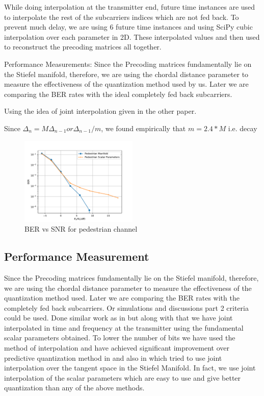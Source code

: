 \documentclass[conference]{IEEEtran}
\begin{document}
While doing interpolation at the transmitter end, future time instances are used to interpolate the rest of the subcarriers indices which are not fed back. To prevent much delay, we are using 6 future time instances and using SciPy cubic interpolation over each parameter in 2D. These interpolated values and then used to reconstruct the precoding matrices all together. 

Performance Measurements: 
Since the Precoding matrices fundamentally lie on the Stiefel manifold, therefore, we are using the chordal distance parameter to measure the effectiveness of the quantization method used by us. Later we are comparing the BER rates with the ideal completely fed back subcarriers. 

Using the idea of joint interpolation given in the other paper. 

Since $\Delta_{n} = M\Delta_{n-1} or \Delta_{n-1}/m $, we found empirically that $m=2.4*M$ i.e. decay 

\begin{figure} 
\includegraphics[width=0.5\textwidth]{images/pedestrian.pdf} 
\caption{BER vs SNR for pedestrian channel} 
\label{ber_overview} 
\vspace{-5pt} 
\end{figure}

\subsection{Performance Measurement} 

\label{setting} 

  

\noindent Since the Precoding matrices fundamentally lie on the Stiefel manifold, therefore, we are using the chordal distance parameter to measure the effectiveness of the quantization method used. Later we are comparing the BER rates with the completely fed back subcarriers. Or simulations and discussions part 2 criteria could be used. Done similar work as in \cite{4114278} but along with that we have joint interpolated in time and frequency at the transmitter using the fundamental scalar parameters obtained. To lower the number of bits we have used the method of interpolation and have achieved significant improvement over predictive quantization method in \cite{6891198} and also in \cite{Gupt1905:Predictive} which tried to use joint interpolation over the tangent space in the Stiefel Manifold. In fact, we use joint interpolation of the scalar parameters which are easy to use and give better quantization than any of the above methods.
\end{document}
